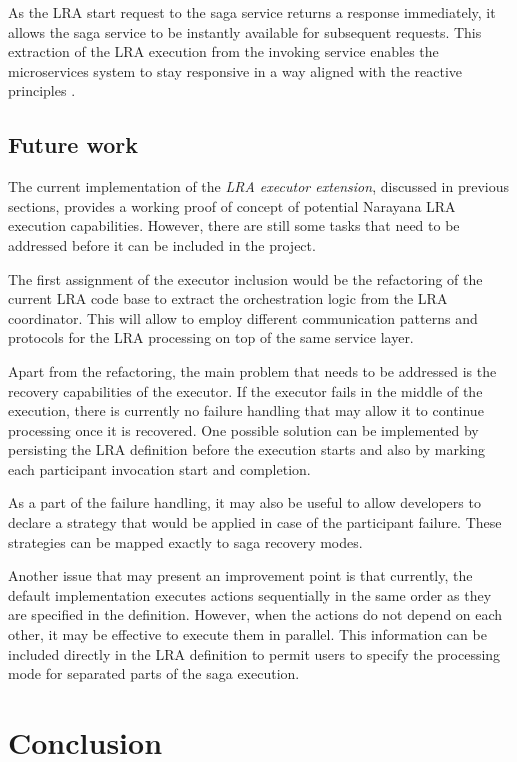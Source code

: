 \documentclass[oneside,
  digital, %
  table,   %
  lof,     %
  lot,     %
]{fithesis3}
\begin{document}
As the LRA start request to the saga service returns a response immediately, it allows the saga service to be instantly available for subsequent requests. This extraction of the LRA execution from the invoking service enables the microservices system to stay responsive in a way aligned with the reactive principles \cite{reactive_manifesto}.

\section{Future work}

The current implementation of the \textit{LRA executor extension}, discussed in previous sections, provides a working proof of concept of potential Narayana LRA execution capabilities. However, there are still some tasks that need to be addressed before it can be included in the project.

The first assignment of the executor inclusion would be the refactoring of the current LRA code base to extract the orchestration logic from the LRA coordinator. This will allow to employ different communication patterns and protocols for the LRA processing on top of the same service layer. 

Apart from the refactoring, the main problem that needs to be addressed is the recovery capabilities of the executor. If the executor fails in the middle of the execution, there is currently no failure handling that may allow it to continue processing once it is recovered. One possible solution can be implemented by persisting the LRA definition before the execution starts and also by marking each participant invocation start and completion.

As a part of the failure handling, it may also be useful to allow developers to declare a strategy that would be applied in case of the participant failure. These strategies can be mapped exactly to saga recovery modes. 

Another issue that may present an improvement point is that currently, the default implementation executes actions sequentially in the same order as they are specified in the definition. However, when the actions do not depend on each other, it may be effective to execute them in parallel. This information can be included directly in the LRA definition to permit users to specify the processing mode for separated parts of the saga execution.


\clearpage
\chapter{Conclusion}
\end{document}
